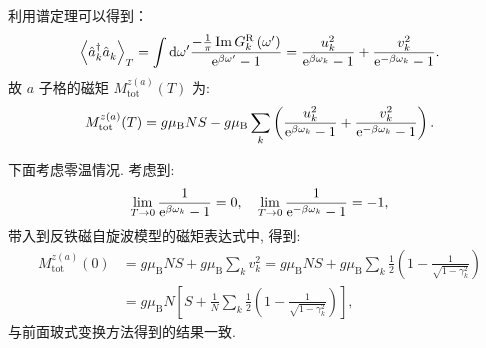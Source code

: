利用谱定理可以得到：
\begin{equation}
\left\langle\hat{a}_{k}^{\dagger} \hat{a}^{}_{k}\right\rangle_{T} =\int \mathrm{d} \omega^{\prime} \frac{-\frac{1}{\pi} \operatorname{Im} G_{k}^\mathrm{R}\left(\omega^{\prime}\right)}{\mathrm{e}^{\beta \omega^{\prime}}-1}=\frac{u_{k}^{2}}{\mathrm{e}^{\beta \omega_{k}}-1}+\frac{v_{k}^{2}}{\mathrm{e}^{-\beta \omega_{k}}-1} .
\end{equation}
故 $a$ 子格的磁矩 $M_{\mathrm{tot}}^{z(a)}(T)$ 为:
\begin{equation}
M_{\mathrm{tot}}^{z(a)}(T)=g \mu_{\mathrm{B}} N S-g \mu_{\mathrm{B}} \sum_{k}\left(\frac{u_{k}^{2}}{\mathrm{e}^{\beta \omega_{k}}-1}+\frac{v_{k}^{2}}{\mathrm{e}^{-\beta \omega_{k}}-1}\right) .
\end{equation}

下面考虑零温情况. 考虑到:
\begin{equation}
\lim _{T \rightarrow 0} \frac{1}{\mathrm{e}^{\beta \omega_{k}}-1}=0, \quad \lim _{T \rightarrow 0} \frac{1}{\mathrm{e}^{-\beta \omega_{k}}-1}=-1,
\end{equation}
带入到反铁磁自旋波模型的磁矩表达式中, 得到:
\begin{align}
M_{\mathrm{tot}}^{z(a)}( 0) &=g \mu_{\mathrm{B}} N S+g \mu_{\mathrm{B}} \sum_{k} v_{k}^{2}=g \mu_{\mathrm{B}} N S+g \mu_{\mathrm{B}} \sum_{k} \frac{1}{2}\left(1-\frac{1}{\sqrt{1-\gamma_{k}^{2}}}\right)\nonumber \\
&=g \mu_{\mathrm{B}} N\left[S+\frac{1}{N} \sum_{k} \frac{1}{2}\left(1-\frac{1}{\sqrt{1-\gamma_{k}^{2}}}\right)\right],
\end{align}
与前面玻式变换方法得到的结果一致.

